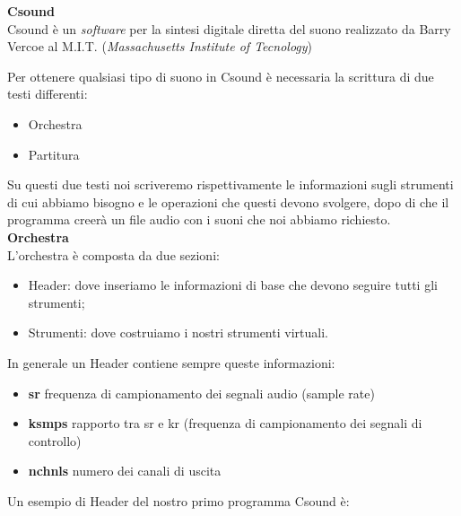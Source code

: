 \documentclass[11pt]{article}
\begin{document}
\begin{multicols*}{2}
\parskip=0pt

\textbf{\textsf {Csound}}\\

\noindent Csound è un \textit {software} per la sintesi digitale diretta del suono  realizzato
da Barry Vercoe al M.I.T. (\textit {Massachusetts Institute of Tecnology})

Per ottenere qualsiasi tipo di suono in Csound è necessaria la scrittura di due testi differenti:
\begin{itemize}
\item Orchestra
\item Partitura
\end{itemize}

Su questi due testi noi scriveremo rispettivamente le informazioni sugli strumenti di cui abbiamo bisogno
e le operazioni che questi devono svolgere, dopo di che il programma creerà un file audio con i suoni 
che noi abbiamo richiesto.\\

\textbf{\textsf {Orchestra}}\\

\noindent L'orchestra è composta da due sezioni:

\begin{itemize}
\item Header: dove inseriamo le informazioni di base che devono seguire tutti gli strumenti;
\item Strumenti: dove costruiamo i nostri strumenti virtuali.
\end{itemize}

In generale un Header contiene sempre queste informazioni:

\begin{itemize}
\item \textbf{sr} frequenza di campionamento dei segnali audio (sample rate)
\item \textbf{ksmps} rapporto tra sr e kr (frequenza di campionamento dei segnali di controllo)
\item \textbf{nchnls} numero dei canali di uscita
\end{itemize}

Un esempio di Header del nostro primo programma Csound è:

\begin{center}
\begin{minipage}[c]{6.2cm}
\begin{sffamily}
\scriptsize


\end{sffamily}
\end{minipage}
\end{center}
\end{multicols*}
\end{document}
